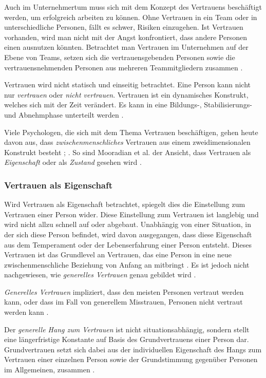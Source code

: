 \documentclass[a4paper,11pt]{article}%
\renewcommand{\\}{\vspace*{0.5\baselineskip} \newline}
\begin{document}
{Auch im Unternehmertum muss sich mit dem Konzept des Vertrauens beschäftigt werden, um erfolgreich arbeiten zu können. Ohne Vertrauen in ein Team oder in unterschiedliche Personen, fällt es schwer, Risiken einzugehen. Ist Vertrauen vorhanden, wird man nicht mit der Angst konfrontiert, dass andere Personen einen ausnutzen könnten. Betrachtet man Vertrauen im Unternehmen auf der Ebene von Teams, setzen sich die vertrauensgebenden Personen sowie die vertrauensnehmenden Personen aus mehreren Teammitgliedern zusammen \citep[S. 1152]{breuer2016does}.

Vertrauen wird nicht statisch und einseitig betrachtet. Eine Person kann nicht nur \textit{vertrauen} oder \textit{nicht vertrauen}. Vertrauen ist ein dynamisches Konstrukt, welches sich mit der Zeit verändert. Es kann in eine Bildungs-, Stabilisierungs- und Abnehmphase unterteilt werden \citep[S. 396]{rousseau1998not}.

Viele Psychologen, die sich mit dem Thema Vertrauen beschäftigen, gehen heute davon aus, dass \textit{zwischenmenschliches} Vertrauen aus einem zweidimensionalen Konstrukt besteht \citep{johnson2005cognitive}; \citep{cook1980new}. So sind Mooradian et al. der Ansicht, dass Vertrauen als \textit{Eigenschaft} oder als \textit{Zustand} gesehen wird \citep[S. 524-525]{mooradian2006trusts}.

\subsubsection{Vertrauen als Eigenschaft }
\label{Vertrauen als Eigenschaft}
Wird Vertrauen als Eigenschaft betrachtet, spiegelt dies die Einstellung zum Vertrauen einer Person wider. Diese Einstellung zum Vertrauen ist langlebig und wird nicht allzu schnell auf oder abgebaut. Unabhängig von einer Situation, in der sich diese Person befindet, wird davon ausgegangen, dass diese Eigenschaft aus dem Temperament oder der Lebenserfahrung einer Person entsteht. Dieses Vertrauen ist das Grundlevel an Vertrauen, das eine Person in eine neue zwischenmenschliche Beziehung von Anfang an mitbringt \citep[S. 11]{couch1996assessment}. Es ist jedoch nicht nachgewiesen, wie \textit{generelles Vertrauen} genau gebildet wird \citep[S. 409]{stolle2002trusting}.

\textit{Generelles Vertrauen} impliziert, dass den meisten Personen vertraut werden kann, oder dass im Fall von generellem Misstrauen, Personen nicht vertraut werden kann \citep[S. 409]{stolle2002trusting}.

Der \textit{generelle Hang zum Vertrauen} ist nicht situationsabhängig, sondern stellt eine längerfristige Konstante auf Basis des Grundvertrauens einer Person dar. Grundvertrauen setzt sich dabei aus der individuellen Eigenschaft des Hangs zum Vertrauen einer einzelnen Person sowie der Grundstimmung gegenüber Personen im Allgemeinen, zusammen \citep[S. 11]{couch1996assessment}.

}
\end{document}
